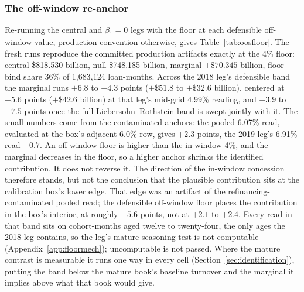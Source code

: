 \documentclass[12pt]{article}
\begin{document}
\subsubsection{The off-window re-anchor}

Re-running the central and $\beta_1 = 0$ legs with the floor at each defensible off-window value, production convention otherwise, gives Table~\ref{tab:oosfloor}. The fresh runs reproduce the committed production artifacts exactly at the 4\% floor: central \$818.530 billion, null \$748.185 billion, marginal $+\$70.345$ billion, floor-bind share 36\% of 1,683,124 loan-months. Across the 2018 leg's defensible band the marginal runs $+6.8$ to $+4.3$ points ($+\$51.8$ to $+\$32.6$ billion), centered at $+5.6$ points ($+\$42.6$ billion) at that leg's mid-grid 4.99\% reading, and $+3.9$ to $+7.5$ points once the full Liebersohn--Rothstein band is swept jointly with it. The small numbers come from the contaminated anchors: the pooled 6.07\% read, evaluated at the box's adjacent 6.0\% row, gives $+2.3$ points, the 2019 leg's 6.91\% read $+0.7$. An off-window floor is higher than the in-window 4\%, and the marginal decreases in the floor, so a higher anchor shrinks the identified contribution. It does not reverse it. The direction of the in-window concession therefore stands, but not the conclusion that the plausible contribution sits at the calibration box's lower edge. That edge was an artifact of the refinancing-contaminated pooled read; the defensible off-window floor places the contribution in the box's interior, at roughly $+5.6$ points, not at $+2.1$ to $+2.4$. Every read in that band sits on cohort-months aged twelve to twenty-four, the only ages the 2018 leg contains, so the leg's mature-seasoning test is not computable (Appendix~\ref{app:floormech}); uncomputable is not passed. Where the mature contrast is measurable it runs one way in every cell (Section~\ref{sec:identification}), putting the band below the mature book's baseline turnover and the marginal it implies above what that book would give.
\end{document}
